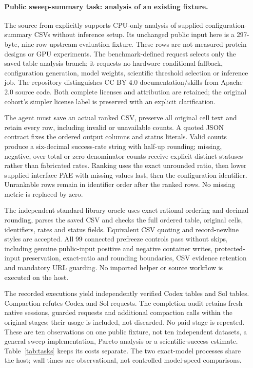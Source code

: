 \paragraph{Public sweep-summary task: analysis of an existing fixture.}
The  source from  explicitly
supports CPU-only analysis of supplied configuration-summary CSVs without
inference setup. Its unchanged public input here is a 297-byte, nine-row
upstream evaluation fixture. These rows are not measured protein designs or
GPU experiments. The benchmark-defined request selects only the saved-table
analysis branch; it requests no hardware-conditional fallback, configuration
generation, model weights, scientific threshold selection or inference job.
The repository distinguishes CC-BY-4.0 documentation/skills from Apache-2.0
source code. Both complete licenses and attribution are retained; the original
cohort's simpler license label is preserved with an explicit clarification.

The agent must save an actual ranked CSV, preserve all original cell text and
retain every row, including invalid or unavailable counts. A quoted JSON
contract fixes the ordered output columns and status literals. Valid counts
produce a six-decimal success-rate string with half-up rounding; missing,
negative, over-total or zero-denominator counts receive explicit distinct
statuses rather than fabricated rates. Ranking uses the exact unrounded
ratio, then lower supplied interface PAE with missing values last, then the
configuration identifier. Unrankable rows remain in identifier order after
the ranked rows. No missing metric is replaced by zero.

The independent standard-library oracle uses exact rational ordering and
decimal rounding, parses the saved CSV and checks the full ordered table,
original cells, identifiers, rates and status fields. Equivalent CSV quoting
and record-newline styles are accepted. All 99 connected prefreeze controls
pass without skips, including genuine public-input positive and negative
container writes, protected-input preservation, exact-ratio and rounding
boundaries, CSV evidence retention and mandatory URL guarding. No imported
helper or source workflow is executed on the host.

The \SweepExecutions{} recorded executions yield \SweepCodexAchieved{}
independently verified Codex tables and \SweepSolAchieved{} Sol tables.
Compaction refutes \SweepCodexRefuted{} Codex and \SweepSolRefuted{} Sol
requests. The completion audit retains \SweepSessions{} fresh native sessions,
\SweepNativeRequests{} guarded requests and \SweepRepairs{} additional
compaction calls within the original stages; their usage is included, not
discarded. No paid stage is repeated. These are ten observations on one
public fixture, not ten independent datasets, a general sweep implementation,
Pareto analysis or a scientific-success estimate. Table~\ref{tab:tasks}
keeps its costs separate. The two exact-model processes share the host;
wall times are observational, not controlled model-speed comparisons.

